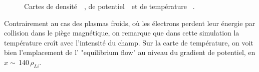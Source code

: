 \begin{refsection}
	\begin{figure}[!htbp]
    \centering
    \caption{Cartes de densité~~, de
    potentiel~~et de température
   ~.}
    \label{2-CartesWithTeFiltre}
	\end{figure}
	
Contrairement au cas des plasmas froids, où les électrons perdent leur énergie
par collision dans le piège magnétique, on
remarque que dans cette simulation la température croît avec
l'intensité du champ. Sur la carte de température, on voit bien l'emplacement de
l' "equilibrium flow" au niveau du gradient de potentiel, en
$x\sim\,$140$\,\rho_{Li}$.
	

\end{refsection}
